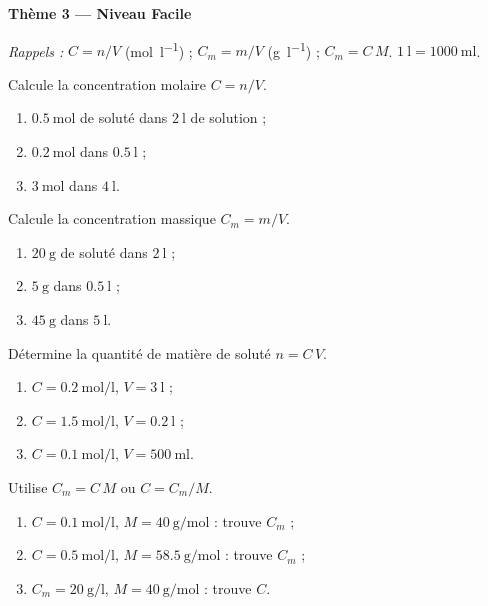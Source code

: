 \documentclass[11pt,a4paper]{article}
\begin{document}
\begin{center}{\large\bfseries\color{primarydark} Thème 3 — Niveau Facile}\end{center}
\emph{Rappels :} $C = n/V$ (\si{\mole\per\litre}) ; $C_m = m/V$ (\si{\gram\per\litre}) ;
$C_m = C\,M$. \quad $\SI{1}{\litre} = \SI{1000}{\milli\litre}$.

\begin{exo}
Calcule la concentration molaire $C = n/V$.
\begin{enumerate}[label=\alph*)]
  \item $\SI{0.5}{\mole}$ de soluté dans $\SI{2}{\litre}$ de solution ;
  \item $\SI{0.2}{\mole}$ dans $\SI{0.5}{\litre}$ ;
  \item $\SI{3}{\mole}$ dans $\SI{4}{\litre}$.
\end{enumerate}
\end{exo}

\begin{exo}
Calcule la concentration massique $C_m = m/V$.
\begin{enumerate}[label=\alph*)]
  \item $\SI{20}{\gram}$ de soluté dans $\SI{2}{\litre}$ ;
  \item $\SI{5}{\gram}$ dans $\SI{0.5}{\litre}$ ;
  \item $\SI{45}{\gram}$ dans $\SI{5}{\litre}$.
\end{enumerate}
\end{exo}

\begin{exo}
Détermine la quantité de matière de soluté $n = C\,V$.
\begin{enumerate}[label=\alph*)]
  \item $C = \SI{0.2}{\mole\per\litre}$, $V = \SI{3}{\litre}$ ;
  \item $C = \SI{1.5}{\mole\per\litre}$, $V = \SI{0.2}{\litre}$ ;
  \item $C = \SI{0.1}{\mole\per\litre}$, $V = \SI{500}{\milli\litre}$.
\end{enumerate}
\end{exo}

\begin{exo}
Utilise $C_m = C\,M$ ou $C = C_m/M$.
\begin{enumerate}[label=\alph*)]
  \item $C = \SI{0.1}{\mole\per\litre}$, $M = \SI{40}{\gram\per\mole}$ : trouve $C_m$ ;
  \item $C = \SI{0.5}{\mole\per\litre}$, $M = \SI{58.5}{\gram\per\mole}$ : trouve $C_m$ ;
  \item $C_m = \SI{20}{\gram\per\litre}$, $M = \SI{40}{\gram\per\mole}$ : trouve $C$.
\end{enumerate}
\end{exo}
\end{document}
